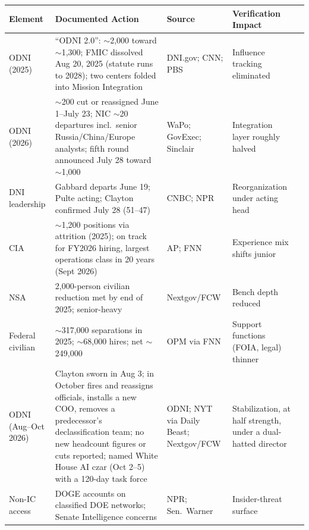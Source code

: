 \documentclass[11pt,letterpaper]{article}
\begin{document}
\begin{criticalbox}
\begin{center}
\scriptsize
\begin{tabularx}{\linewidth}{ZY{0.65}Y{1.85}Y{0.68}Y{0.82}}
\toprule
\textbf{Element} & \textbf{Documented Action} & \textbf{Source} & \textbf{Verification Impact} \\
\midrule
ODNI (2025) & ``ODNI 2.0'': $\sim$2,000 toward $\sim$1,300; FMIC dissolved Aug 20, 2025 (statute runs to 2028); two centers folded into Mission Integration & DNI.gov; CNN; PBS & Influence tracking eliminated \\
ODNI (2026) & $\sim$200 cut or reassigned June 1--July 23; NIC $\sim$20 departures incl.\ senior Russia/China/Europe analysts; fifth round announced July 28 toward $\sim$1,000 & WaPo; GovExec; Sinclair & Integration layer roughly halved \\
DNI leadership & Gabbard departs June 19; Pulte acting; Clayton confirmed July 28 (51--47) & CNBC; NPR & Reorganization under acting head \\
CIA & $\sim$1,200 positions via attrition (2025); on track for FY2026 hiring, largest operations class in 20 years (Sept 2026) & AP; FNN & Experience mix shifts junior \\
NSA & 2,000-person civilian reduction met by end of 2025; senior-heavy & Nextgov/FCW & Bench depth reduced \\
Federal civilian & $\sim$317,000 separations in 2025; $\sim$68,000 hires; net $\sim$249,000 & OPM via FNN & Support functions (FOIA, legal) thinner \\
ODNI (Aug--Oct 2026) & Clayton sworn in Aug 3; in October fires and reassigns officials, installs a new COO, removes a predecessor's declassification team; no new headcount figures or cuts reported; named White House AI czar (Oct 2--5) with a 120-day task force & ODNI; NYT via Daily Beast; Nextgov/FCW & Stabilization, at half strength, under a dual-hatted director \\
Non-IC access & DOGE accounts on classified DOE networks; Senate Intelligence concerns & NPR; Sen.\ Warner & Insider-threat surface \\
\bottomrule
\end{tabularx}
\end{center}
\end{criticalbox}
\end{document}
